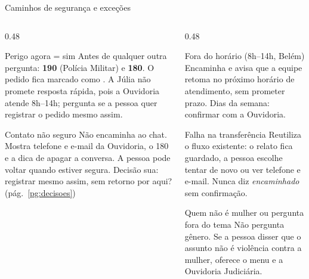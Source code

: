 \documentclass[aspectratio=169,10pt]{beamer}
\newcommand{\code}[1]{\texttt{\detokenize{#1}}}
\begin{document}
\begin{frame}{Caminhos de segurança e exceções}
\begin{columns}[T]
\begin{column}{0.48\textwidth}
\begin{block}{\small Perigo agora = sim}
\scriptsize Antes de qualquer outra pergunta: \textbf{190} (Polícia Militar) e \textbf{180}. O pedido fica marcado como \code{urgencia_imediata}. A Júlia não promete resposta rápida, pois a Ouvidoria atende 8h--14h; pergunta se a pessoa quer registrar o pedido mesmo assim.
\end{block}
\begin{block}{\small Contato não seguro}
\scriptsize Não encaminha ao chat. Mostra telefone e e-mail da Ouvidoria, o 180 e a dica de apagar a conversa. A pessoa pode voltar quando estiver segura. \alert{Decisão sua:} registrar mesmo assim, sem retorno por aqui? (pág.~\ref{pg:decisoes})
\end{block}
\end{column}
\begin{column}{0.48\textwidth}
\begin{block}{\small Fora do horário (8h--14h, Belém)}
\scriptsize Encaminha e avisa que a equipe retoma no próximo horário de atendimento, sem prometer prazo. \alert{Dias da semana: confirmar com a Ouvidoria.}
\end{block}
\begin{block}{\small Falha na transferência}
\scriptsize Reutiliza o fluxo existente: o relato fica guardado, a pessoa escolhe tentar de novo ou ver telefone e e-mail. Nunca diz \emph{encaminhado} sem confirmação.
\end{block}
\begin{block}{\small Quem não é mulher ou pergunta fora do tema}
\scriptsize Não pergunta gênero. Se a pessoa disser que o assunto não é violência contra a mulher, oferece o menu e a Ouvidoria Judiciária.
\end{block}
\end{column}
\end{columns}
\end{frame}
\end{document}
